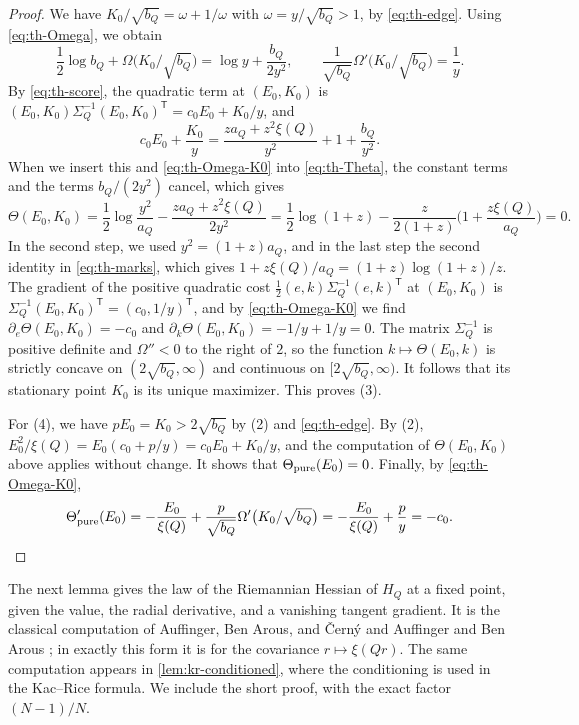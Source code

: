 \begin{proof}
We have $K_0/\sqrt{b_Q}=\omega+1/\omega$ with $\omega=y/\sqrt{b_Q}>1$, by \eqref{eq:th-edge}. Using \eqref{eq:th-Omega}, we obtain
\begin{equation}\label{eq:th-Omega-K0}
\frac12\log b_Q+\Omega\big(K_0/\sqrt{b_Q}\big)=\log y+\frac{b_Q}{2y^2},\qquad\frac1{\sqrt{b_Q}}\Omega'\big(K_0/\sqrt{b_Q}\big)=\frac1y.
\end{equation}
By \eqref{eq:th-score}, the quadratic term at $(E_0,K_0)$ is $(E_0,K_0)\Sigma_Q^{-1}(E_0,K_0)^{\mathsf T}=c_0E_0+K_0/y$, and
\[
c_0E_0+\frac{K_0}y=\frac{za_Q+z^2\xi(Q)}{y^2}+1+\frac{b_Q}{y^2}.
\]
When we insert this and \eqref{eq:th-Omega-K0} into \eqref{eq:th-Theta}, the constant terms and the terms $b_Q/(2y^2)$ cancel, which gives
\[
\Theta(E_0,K_0)=\frac12\log\frac{y^2}{a_Q}-\frac{za_Q+z^2\xi(Q)}{2y^2}=\frac12\log(1+z)-\frac z{2(1+z)}\Big(1+\frac{z\xi(Q)}{a_Q}\Big)=0.
\]
In the second step, we used $y^2=(1+z)a_Q$, and in the last step the second identity in \eqref{eq:th-marks}, which gives $1+z\xi(Q)/a_Q=(1+z)\log(1+z)/z$. The gradient of the positive quadratic cost $\frac12(e,k)\Sigma_Q^{-1}(e,k)^{\mathsf T}$ at $(E_0,K_0)$ is $\Sigma_Q^{-1}(E_0,K_0)^{\mathsf T}=(c_0,1/y)^{\mathsf T}$, and by \eqref{eq:th-Omega-K0} we find $\partial_e\Theta(E_0,K_0)=-c_0$ and $\partial_k\Theta(E_0,K_0)=-1/y+1/y=0$. The matrix $\Sigma_Q^{-1}$ is positive definite and $\Omega''<0$ to the right of $2$, so the function $k\mapsto\Theta(E_0,k)$ is strictly concave on $(2\sqrt{b_Q},\infty)$ and continuous on $[2\sqrt{b_Q},\infty)$. It follows that its stationary point $K_0$ is its unique maximizer. This proves (3).

For (4), we have $pE_0=K_0>2\sqrt{b_Q}$ by (2) and \eqref{eq:th-edge}. By (2), $E_0^2/\xi(Q)=E_0(c_0+p/y)=c_0E_0+K_0/y$, and the computation of $\Theta(E_0,K_0)$ above applies without change. It shows that $\Theta_{\rm pure}(E_0)=0$. Finally, by \eqref{eq:th-Omega-K0},
\[
\Theta_{\rm pure}'(E_0)=-\frac{E_0}{\xi(Q)}+\frac p{\sqrt{b_Q}}\Omega'\big(K_0/\sqrt{b_Q}\big)=-\frac{E_0}{\xi(Q)}+\frac py=-c_0.\qedhere
\]
\end{proof}

The next lemma gives the law of the Riemannian Hessian of $H_Q$ at a fixed point, given the value, the radial derivative, and a vanishing tangent gradient. It is the classical computation of Auffinger, Ben Arous, and \v{C}ern\'y \cite{AuffingerBenArousCerny2013} and Auffinger and Ben Arous \cite{AuffingerBenArous2013}; in exactly this form it is \cite[(2.11) and Lemma~2.14]{HuangSellke2024} for the covariance $r\mapsto\xi(Qr)$. The same computation appears in \cref{lem:kr-conditioned}, where the conditioning is used in the Kac--Rice formula. We include the short proof, with the exact factor $(N-1)/N$.

